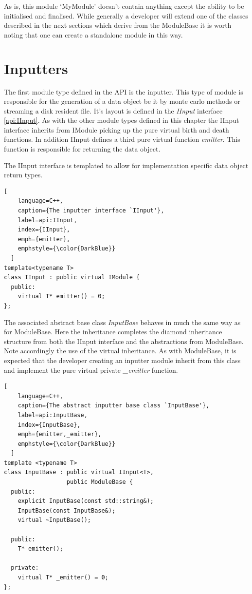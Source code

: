 As is, this module `MyModule' doesn't contain anything except the ability to be initialised and finalised. While generally a developer will extend one of the classes described in the next sections which derive from the ModuleBase it is worth noting that one can create a standalone module in this way.

\section{Inputters}
The first module type defined in the API is the inputter. This type of module is responsible for the generation of a data object be it by monte carlo methods or streaming a disk resident file. It's layout is defined in the \emph{IInput} interface \ref{api:IInput}. As with the other module types defined in this chapter the IInput interface inherits from IModule picking up the pure virtual birth and death functions. In addition IInput defines a third pure virtual function \emph{emitter}. This function is responsible for returning the data object.

The IInput interface is templated to allow for implementation specific data object return types.
\begin{lstlisting}[
    language=C++,
    caption={The inputter interface `IInput'},
    label=api:IInput, 
    index={IInput},
    emph={emitter},
    emphstyle={\color{DarkBlue}}
  ]
template<typename T>
class IInput : public virtual IModule {
  public:
    virtual T* emitter() = 0;
};
\end{lstlisting}


The associated abstract base class \emph{InputBase} behaves in much the same way as for ModuleBase. Here the inheritance completes the diamond inheritance structure from both the IInput interface and the abstractions from ModuleBase. Note accordingly the use of the virtual inheritance. As with ModuleBase, it is expected that the developer creating an inputter module inherit from this class and implement the pure virtual private \emph{\_emitter} function.
\begin{lstlisting}[
    language=C++,
    caption={The abstract inputter base class `InputBase'},
    label=api:InputBase, 
    index={InputBase},
    emph={emitter,_emitter},
    emphstyle={\color{DarkBlue}}
  ]
template <typename T>
class InputBase : public virtual IInput<T>, 
                  public ModuleBase {
  public:
    explicit InputBase(const std::string&);
    InputBase(const InputBase&);
    virtual ~InputBase();

  public:
    T* emitter();

  private:
    virtual T* _emitter() = 0;
};
\end{lstlisting}

